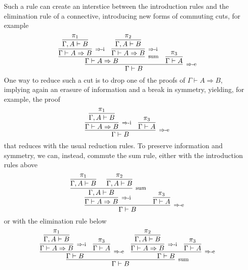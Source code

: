 \documentclass[screen, sigconf,authorversion,nonacm]{acmart}
\theoremstyle{acmdefinition}
\numberwithin{equation}{section}
\newcommand\irule[3]{\infer[\mbox{\footnotesize $#3$}]{#2}{#1}}
\begin{document}
Such a rule can create an interstice between the introduction rules
and the elimination rule of a connective, introducing new forms of
commuting cuts, for example
$$\irule{\irule{\irule{\irule{\pi_1}
                             {\Gamma, A \vdash B}
                             {}
                      }
                      {\Gamma \vdash A \Rightarrow B}
                      {\mbox{$\Rightarrow$-i}}
               &\irule{\irule{\pi_2}
                             {\Gamma, A \vdash B}
                             {}
                      }
                      {\Gamma \vdash A \Rightarrow B}
                      {\mbox{$\Rightarrow$-i}}
               }
               {\Gamma \vdash A \Rightarrow B}
               {\mbox{sum}}
       & \irule{\pi_3}
               {\Gamma \vdash A}
               {}
        }
        {\Gamma \vdash B}
        {\mbox{$\Rightarrow$-e}}$$
One way to reduce such a cut is to drop one of the proofs of $\Gamma
\vdash A \Rightarrow B$, implying again an erasure of information and
a break in symmetry, yielding, for example, the proof
$$\irule{\irule{\irule{\pi_1}
                      {\Gamma, A \vdash B}
                      {}
               }
               {\Gamma \vdash A \Rightarrow B}
               {\mbox{$\Rightarrow$-i}}
       & \irule{\pi_3}
               {\Gamma \vdash A}
               {}
        }
        {\Gamma \vdash B}
        {\mbox{$\Rightarrow$-e}}$$
that reduces with the usual reduction rules. To preserve information
and symmetry, we can, instead, commute the sum rule, either with
the introduction rules above
$$\irule{\irule{\irule{\irule{\pi_1}
                             {\Gamma, A \vdash B}
                             {}
                      &\irule{\pi_2}
                             {\Gamma, A \vdash B}
                             {}
                      }
                      {\Gamma, A \vdash B}
                      {\mbox{sum}}
               }
               {\Gamma \vdash A \Rightarrow B}
               {\mbox{$\Rightarrow$-i}}
       & \irule{\pi_3}
               {\Gamma \vdash A}
               {}
        }
        {\Gamma \vdash B}
        {\mbox{$\Rightarrow$-e}}$$
or with the elimination rule below
$$\irule{\irule{\irule{\irule{\pi_1}
                             {\Gamma, A \vdash B}
                             {}
                      }
                      {\Gamma \vdash A \Rightarrow B}
                      {\mbox{$\Rightarrow$-i}}
               &\irule{\pi_3}
                      {\Gamma \vdash A}
                      {}
                }
                {\Gamma \vdash B}
                {\mbox{$\Rightarrow$-e}}
         &\irule{\irule{\irule{\pi_2}
                              {\Gamma, A \vdash B}
                              {}
                       }
                       {\Gamma \vdash A \Rightarrow B}
                       {\mbox{$\Rightarrow$-i}}
                &\irule{\pi_3}
                       {\Gamma \vdash A}
                       {}
                }
                {\Gamma \vdash B}
                {\mbox{$\Rightarrow$-e}}
          }
          {\Gamma \vdash B}
          {\mbox{sum}}$$
\end{document}
